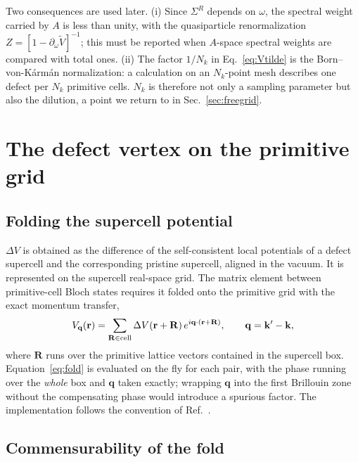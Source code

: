 \documentclass[aps,prx,reprint,superscriptaddress,nofootinbib,longbibliography]{revtex4-2}
\newcommand{\dV}{\Delta V}
\newcommand{\Vt}{\widetilde{V}}
\newcommand{\kk}{\mathbf{k}}
\newcommand{\rr}{\mathbf{r}}
\newcommand{\RR}{\mathbf{R}}
\newcommand{\qq}{\mathbf{q}}
\begin{document}
Two consequences are used later. (i) Since $\Sigma^R$ depends on $\omega$, the
spectral weight carried by $A$ is less than unity, with the quasiparticle
renormalization $Z = [1 - \partial_\omega \Vt]^{-1}$; this must be reported when
$A$-space spectral weights are compared with total ones. (ii) The factor
$1/N_k$ in Eq.~\eqref{eq:Vtilde} is the Born--von-K\'arm\'an normalization: a
calculation on an $N_k$-point mesh describes one defect per $N_k$ primitive
cells. $N_k$ is therefore not only a sampling parameter but also the dilution,
a point we return to in Sec.~\ref{sec:freegrid}.


\section{The defect vertex on the primitive grid}
\label{sec:vertex}

\subsection{Folding the supercell potential}

$\dV$ is obtained as the difference of the self-consistent local potentials of
a defect supercell and the corresponding pristine supercell, aligned in the
vacuum. It is represented on the supercell real-space grid. The matrix element
between primitive-cell Bloch states requires it folded onto the primitive grid
with the exact momentum transfer,
\begin{equation}
  V_\qq(\rr) = \sum_{\RR \in \rm cell}
  \dV(\rr + \RR)\, e^{i\qq \cdot (\rr + \RR)},
  \qquad \qq = \kk' - \kk,
  \label{eq:fold}
\end{equation}
where $\RR$ runs over the primitive lattice vectors contained in the supercell
box. Equation~\eqref{eq:fold} is evaluated on the fly for each pair, with the
phase running over the \emph{whole} box and $\qq$ taken exactly; wrapping
$\qq$ into the first Brillouin zone without the compensating phase would
introduce a spurious factor. The implementation follows the convention of
Ref.~.

\subsection{Commensurability of the fold}
\end{document}
